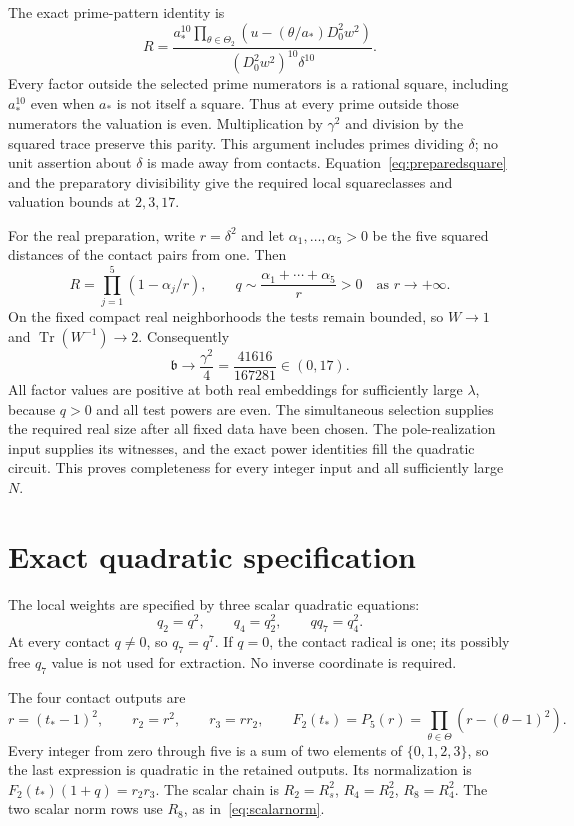 \documentclass[11pt,a4paper]{article}
\DeclareMathOperator{\Tr}{Tr}\DeclareMathOperator{\Nm}{Nm}
\begin{document}
The exact prime-pattern identity is
\[
 R=\frac{\displaystyle a_*^{10}\prod_{\theta\in\Theta_2}
          (u-(\theta/a_*)D_0^2w^2)}
        {(D_0^2w^2)^{10}\delta^{10}}.
\]
Every factor outside the selected prime numerators is a rational
square, including $a_*^{10}$ even when $a_*$ is not itself a square.
Thus at every prime outside those numerators the valuation is even. Multiplication by $\gamma^2$ and division by the squared trace preserve this parity. This argument includes primes dividing $\delta$;
no unit assertion about $\delta$ is made away from contacts.
Equation~\eqref{eq:preparedsquare} and the preparatory divisibility
give the required local squareclasses and valuation bounds at $2,3,17$.

For the real preparation, write $r=\delta^2$ and let
$\alpha_1,\ldots,\alpha_5>0$ be the five squared distances of the
contact pairs from one. Then
\[
 R=\prod_{j=1}^{5}(1-\alpha_j/r),\qquad
 q\sim\frac{\alpha_1+\cdots+\alpha_5}r>0
 \quad\text{as }r\longrightarrow+\infty.
\]
On the fixed compact real neighborhoods the tests remain bounded, so
$W\to1$ and $\Tr(W^{-1})\to2$. Consequently
\[
              \mathfrak b\longrightarrow\frac{\gamma^2}{4}
                              =\frac{41616}{167281}\in(0,17).
\]
All factor values are positive at both real embeddings for sufficiently
large $\lambda$, because $q>0$ and all test powers are even.
The simultaneous selection supplies the required real size after all
fixed data have been chosen. The pole-realization input supplies its
witnesses, and the exact power identities fill the quadratic circuit.
This proves completeness for every integer input and all sufficiently large $N$.

\section{Exact quadratic specification}
The local weights are specified by three scalar quadratic equations:
\[
                     q_2=q^2,\qquad q_4=q_2^2,\qquad qq_7=q_4^2.
\]
At every contact $q\ne0$, so $q_7=q^7$. If $q=0$, the contact
radical is one; its possibly free $q_7$ value is not used for extraction.
No inverse coordinate is required.

The four contact outputs are
\[
 r=(t_*-1)^2,\qquad r_2=r^2,\qquad r_3=rr_2,\qquad
 F_2(t_*)=P_5(r)=\prod_{\theta\in\Theta}(r-(\theta-1)^2).
\]
Every integer from zero through five is a sum of two elements of
$\{0,1,2,3\}$, so the last expression is quadratic in the retained
outputs. Its normalization is $F_2(t_*)(1+q)=r_2r_3$.
The scalar chain is $R_2=R_s^2$, $R_4=R_2^2$, $R_8=R_4^2$.
The two scalar norm rows use $R_8$, as in~\eqref{eq:scalarnorm}.
\end{document}
